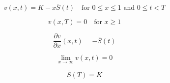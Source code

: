 \begin{equation}
    v(x, t) = K - x\bar{S}(t) \quad  \text{for $0 \le x \le 1$ and $0 \le t < T$}
\end{equation}

\begin{equation}
    v(x, T) = 0 \quad \text{for $x \ge 1$}
\end{equation}

\begin{equation}
    \frac{\partial{v}}{\partial{x}}(x, t) = -\bar{S}(t)
\end{equation}

\begin{equation}
    \lim_{x \rightarrow \infty} v(x, t) = 0
\end{equation}

\begin{equation}
    \bar{S}(T) = K
\end{equation}